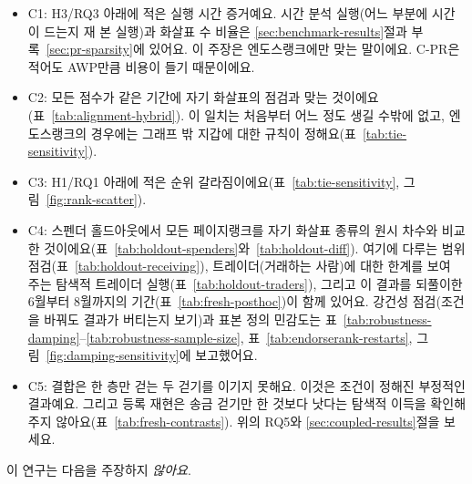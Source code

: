 \begin{itemize}
\item C1: H3/RQ3 아래에 적은 실행 시간 증거예요. 시간 분석 실행(어느 부분에 시간이 드는지 재 본 실행)과 화살표 수 비율은 \ref{sec:benchmark-results}절과 부록~\ref{sec:pr-sparsity}에 있어요. 이 주장은 엔도스랭크에만 맞는 말이에요. C-PR은 적어도 AWP만큼 비용이 들기 때문이에요.
\item C2: 모든 점수가 같은 기간에 자기 화살표의 점검과 맞는 것이에요(표~\ref{tab:alignment-hybrid}). 이 일치는 처음부터 어느 정도 생길 수밖에 없고, 엔도스랭크의 경우에는 그래프 밖 지갑에 대한 규칙이 정해요(표~\ref{tab:tie-sensitivity}).
\item C3: H1/RQ1 아래에 적은 순위 갈라짐이에요(표~\ref{tab:tie-sensitivity}, 그림~\ref{fig:rank-scatter}).
\item C4: 스펜더 홀드아웃에서 모든 페이지랭크를 자기 화살표 종류의 원시 차수와 비교한 것이에요(표~\ref{tab:holdout-spenders}와~\ref{tab:holdout-diff}). 여기에 다루는 범위 점검(표~\ref{tab:holdout-receiving}), 트레이더(거래하는 사람)에 대한 한계를 보여 주는 탐색적 트레이더 실행(표~\ref{tab:holdout-traders}), 그리고 이 결과를 되풀이한 6월부터 8월까지의 기간(표~\ref{tab:fresh-posthoc})이 함께 있어요. 강건성 점검(조건을 바꿔도 결과가 버티는지 보기)과 표본 정의 민감도는 표~\ref{tab:robustness-damping}--\ref{tab:robustness-sample-size}, 표~\ref{tab:endorserank-restarts}, 그림~\ref{fig:damping-sensitivity}에 보고했어요.
\item C5: 결합은 한 층만 걷는 두 걷기를 이기지 못해요. 이것은 조건이 정해진 부정적인 결과예요. 그리고 등록 재현은 송금 걷기만 한 것보다 낫다는 탐색적 이득을 확인해 주지 않아요(표~\ref{tab:fresh-contrasts}). 위의 RQ5와 \ref{sec:coupled-results}절을 보세요.
\end{itemize}


이 연구는 다음을 주장하지 \emph{않아요}.


